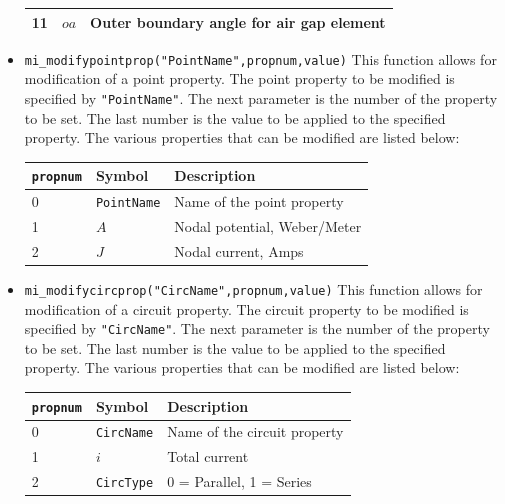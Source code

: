 \begin{itemize}
\begin{center}
\begin{tabular}{lll}
11 & $oa$ & Outer boundary angle for air gap element \\ \hline
\end{tabular}
\end{center}
\item{\verb+mi_modifypointprop("PointName",propnum,value)+}
This function allows for modification of a point property. The
point property to be modified is specified by {\tt "PointName"}.
The next parameter is the number of the property to be set. The
last number is the value to be applied to the specified property.
The various properties that can be modified are listed below:
\begin{center}
\begin{tabular}{lll} \hline
{\tt propnum}& Symbol & Description \\ \hline
 0 & {\tt PointName} & Name of the point property \\
 1 & $A$ & Nodal potential, Weber/Meter \\
 2 & $J$ & Nodal current, Amps \\ \hline
\end{tabular}
\end{center}
\item{\verb+mi_modifycircprop("CircName",propnum,value)+}
This function allows for modification of a circuit property. The
circuit property to be modified is specified by {\tt "CircName"}.
The next parameter is the number of the property to be set. The
last number is the value to be applied to the specified property.
The various properties that can be modified are listed below:
\begin{center}
\begin{tabular}{lll} \hline
{\tt propnum}& Symbol & Description \\ \hline
 0 & {\tt CircName} & Name of the circuit property \\
 1 & $i$ & Total current \\
 2 & {\tt CircType} & 0 = Parallel, 1 = Series \\ \hline
 \end{tabular}
 \end{center}
\end{itemize}

